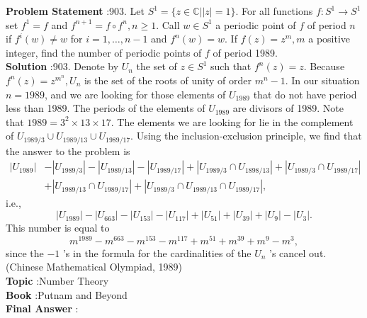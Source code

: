 \documentclass[10pt]{article}
\begin{document}
\textbf{Problem Statement} :903. Let $S^{1}=\{z \in \mathbb{C}|| z \mid=1\}$. For all functions $f: S^{1} \rightarrow S^{1}$ set $f^{1}=f$ and $f^{n+1}=f \circ f^{n}, n \geq 1$. Call $w \in S^{1}$ a periodic point of $f$ of period $n$ if $f^{i}(w) \neq w$ for $i=1, \ldots, n-1$ and $f^{n}(w)=w$. If $f(z)=z^{m}, m$ a positive integer, find the number of periodic points of $f$ of period 1989.\\
\textbf{Solution} :903. Denote by $U_{n}$ the set of $z \in S^{1}$ such that $f^{n}(z)=z$. Because $f^{n}(z)=z^{m^{n}}, U_{n}$ is the set of the roots of unity of order $m^{n}-1$. In our situation $n=1989$, and we are looking for those elements of $U_{1989}$ that do not have period less than 1989. The periods of the elements of $U_{1989}$ are divisors of 1989. Note that $1989=3^{2} \times 13 \times 17$. The elements we are looking for lie in the complement of $U_{1989 / 3} \cup U_{1989 / 13} \cup U_{1989 / 17}$. Using the inclusion-exclusion principle, we find that the answer to the problem is$$ \begin{aligned} \left|U_{1989}\right| &-\left|U_{1989 / 3}\right|-\left|U_{1989 / 13}\right|-\left|U_{1989 / 17}\right|+\left|U_{1989 / 3} \cap U_{1898 / 13}\right|+\left|U_{1989 / 3} \cap U_{1989 / 17}\right| \\ &+\left|U_{1989 / 13} \cap U_{1989 / 17}\right|+\left|U_{1989 / 3} \cap U_{1989 / 13} \cap U_{1989 / 17}\right|, \end{aligned} $$i.e.,$$ \left|U_{1989}\right|-\left|U_{663}\right|-\left|U_{153}\right|-\left|U_{117}\right|+\left|U_{51}\right|+\left|U_{39}\right|+\left|U_{9}\right|-\left|U_{3}\right| . $$This number is equal to$$ m^{1989}-m^{663}-m^{153}-m^{117}+m^{51}+m^{39}+m^{9}-m^{3}, $$since the $-1$ 's in the formula for the cardinalities of the $U_{n}$ 's cancel out.(Chinese Mathematical Olympiad, 1989)\\
\textbf{Topic} :Number Theory\\
\textbf{Book} :Putnam and Beyond\\
\textbf{Final Answer} :\\
\end{document}
